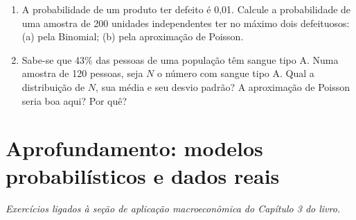 \documentclass[11pt]{article}
\begin{document}
\begin{enumerate}[label=\textbf{C\arabic*.}, leftmargin=*]
\begin{enumerate}[label=(\alph*)]
  \item Qual a probabilidade de devolver o dinheiro de um pacote?
  \item Quem compra dez pacotes independentes, com que probabilidade terá dinheiro devolvido em pelo menos um?
\end{enumerate}
\item A probabilidade de um produto ter defeito é 0,01. Calcule a probabilidade de uma amostra de 200 unidades independentes ter no máximo dois defeituosos: (a) pela Binomial; (b) pela aproximação de Poisson.
\item Sabe-se que 43\% das pessoas de uma população têm sangue tipo A. Numa amostra de 120 pessoas, seja $N$ o número com sangue tipo A. Qual a distribuição de $N$, sua média e seu desvio padrão? A aproximação de Poisson seria boa aqui? Por quê?

\end{enumerate}

\bigskip
{}
\section*{Aprofundamento: modelos probabilísticos e dados reais}
\noindent\textit{Exercícios ligados à seção de aplicação macroeconômica do Capítulo 3 do livro.}
\end{document}
